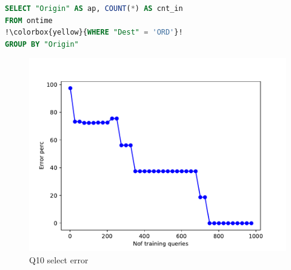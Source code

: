 \begin{frame}[fragile]
\begin{lstlisting}[basicstyle=\ttfamily\footnotesize, language=SQL, escapechar=!]
SELECT "Origin" AS ap, COUNT(*) AS cnt_in
FROM ontime
!\colorbox{yellow}{WHERE "Dest" = 'ORD'}!
GROUP BY "Origin"
\end{lstlisting}
	\begin{figure}[!htb]
		\centering
		\includegraphics[scale=0.45]{../figs/airtraffic/airtraffic_sel10_error.pdf}
		\caption{Q10 select error}
	\end{figure}
\end{frame}

